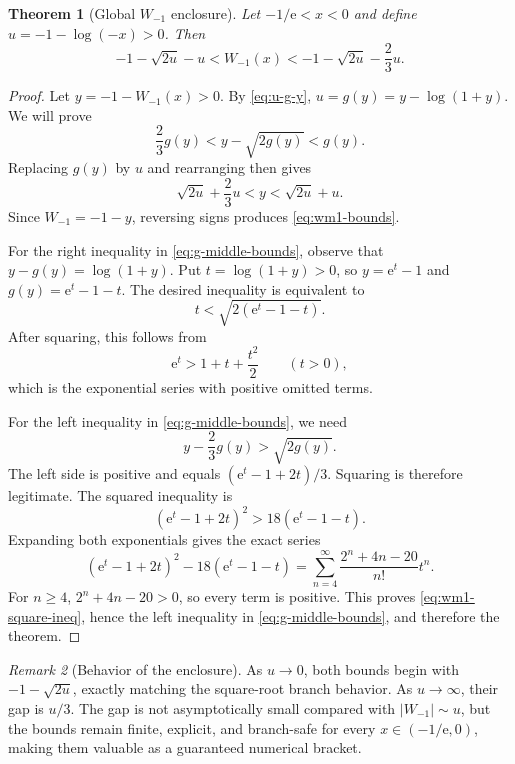 \documentclass[11pt]{article}
\numberwithin{equation}{section}
\newtheorem{theorem}{Theorem}[section]
\theoremstyle{definition}
\theoremstyle{remark}
\newtheorem{remark}[theorem]{Remark}
\newcommand{\e}{\mathrm e}
\begin{document}
\begin{theorem}[Global $W_{-1}$ enclosure]
\label{thm:wm1-bounds}
Let $-1/\e<x<0$ and define $u=-1-\log(-x)>0$.  Then
\begin{equation}
 -1-\sqrt{2u}-u
 < W_{-1}(x)
 < -1-\sqrt{2u}-\frac23u.                              \label{eq:wm1-bounds}
\end{equation}
\end{theorem}

\begin{proof}
Let $y=-1-W_{-1}(x)>0$.  By \eqref{eq:u-g-y},
$u=g(y)=y-\log(1+y)$.  We will prove
\begin{equation}
  \frac23g(y)<y-\sqrt{2g(y)}<g(y).                     \label{eq:g-middle-bounds}
\end{equation}
Replacing $g(y)$ by $u$ and rearranging then gives
\[
  \sqrt{2u}+\frac23u<y<\sqrt{2u}+u.
\]
Since $W_{-1}=-1-y$, reversing signs produces
\eqref{eq:wm1-bounds}.

For the right inequality in \eqref{eq:g-middle-bounds}, observe that
$y-g(y)=\log(1+y)$.  Put $t=\log(1+y)>0$, so
$y=\e^t-1$ and $g(y)=\e^t-1-t$.  The desired inequality is equivalent to
\[
  t<\sqrt{2(\e^t-1-t)}.
\]
After squaring, this follows from
\[
  \e^t>1+t+\frac{t^2}{2}\qquad(t>0),
\]
which is the exponential series with positive omitted terms.

For the left inequality in \eqref{eq:g-middle-bounds}, we need
\[
  y-\frac23g(y)>\sqrt{2g(y)}.
\]
The left side is positive and equals
$(\e^t-1+2t)/3$.  Squaring is therefore legitimate.  The squared inequality
is
\begin{equation}
  (\e^t-1+2t)^2>18(\e^t-1-t).                          \label{eq:wm1-square-ineq}
\end{equation}
Expanding both exponentials gives the exact series
\begin{equation}
 (\e^t-1+2t)^2-18(\e^t-1-t)
 =\sum_{n=4}^{\infty}\frac{2^n+4n-20}{n!}t^n.         \label{eq:wm1-positive-series}
\end{equation}
For $n\ge4$, $2^n+4n-20>0$, so every term is positive.  This proves
\eqref{eq:wm1-square-ineq}, hence the left inequality in
\eqref{eq:g-middle-bounds}, and therefore the theorem.
\end{proof}

\begin{remark}[Behavior of the enclosure]
As $u\to0$, both bounds begin with $-1-\sqrt{2u}$, exactly matching the
square-root branch behavior.  As $u\to\infty$, their gap is $u/3$.  The gap is
not asymptotically small compared with $|W_{-1}|\sim u$, but the bounds remain
finite, explicit, and branch-safe for every $x\in(-1/\e,0)$, making them
valuable as a guaranteed numerical bracket.
\end{remark}
\end{document}
